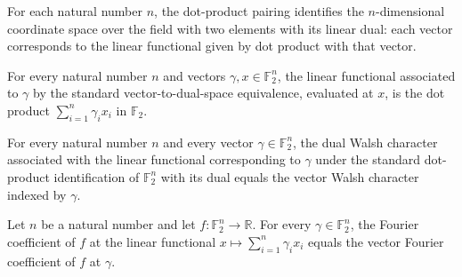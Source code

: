 \begin{definition}
\label{FABL.vectorDualEquiv}
\leanok
{}
For each natural number $n$, the dot-product pairing identifies the $n$-dimensional
coordinate space over the field with two elements with its linear dual: each vector
corresponds to the linear functional given by dot product with that vector.
\end{definition}

\begin{theorem}
\label{FABL.vectorDualEquiv_apply}
\leanok
{}
For every natural number $n$ and vectors $\gamma,x\in\mathbb{F}_2^n$, the linear
functional associated to $\gamma$ by the standard vector-to-dual-space equivalence,
evaluated at $x$, is the dot product $\sum_{i=1}^n\gamma_i x_i$ in $\mathbb{F}_2$.
\end{theorem}

\begin{theorem}
\label{FABL.dualWalshCharacter_vectorDualEquiv}
\leanok
{}
For every natural number $n$ and every vector $\gamma\in\mathbb{F}_2^n$, the dual Walsh
character associated with the linear functional corresponding to $\gamma$ under the
standard dot-product identification of $\mathbb{F}_2^n$ with its dual equals the vector
Walsh character indexed by $\gamma$.
\end{theorem}

\begin{theorem}
\label{FABL.dualFourierCoeff_vectorDualEquiv}
\leanok
{}
Let $n$ be a natural number and let $f:\mathbb{F}_2^n\to\mathbb{R}$. For every
$\gamma\in\mathbb{F}_2^n$, the Fourier coefficient of $f$ at the linear functional
$x\mapsto\sum_{i=1}^n\gamma_i x_i$ equals the vector Fourier coefficient of $f$ at
$\gamma$.
\end{theorem}

